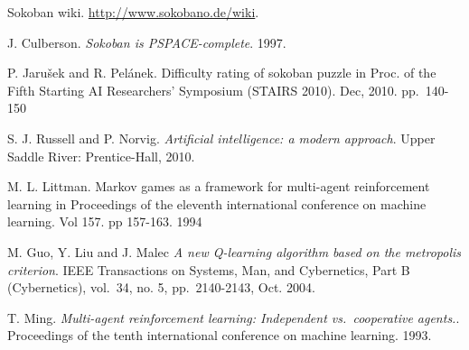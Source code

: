 \documentclass[times, 10pt,twocolumn]{article}
\begin{document}
\begin{thebibliography}{9}
Sokoban wiki.
\url{http://www.sokobano.de/wiki}.


J. Culberson. 
\textit{Sokoban is PSPACE-complete}.
1997.

P. Jarušek and R. Pelánek.
Difficulty rating of sokoban puzzle
in Proc. of the Fifth Starting AI Researchers' Symposium (STAIRS 2010).
Dec, 2010. pp.~140-150

S. J. Russell and P. Norvig.
\textit{Artificial intelligence: a modern approach}.
Upper Saddle River: Prentice-Hall, 2010.

M. L. Littman.
Markov games as a framework for multi-agent
reinforcement learning in Proceedings of the eleventh international
conference on machine learning. Vol 157. pp 157-163. 1994

M. Guo, Y. Liu and J. Malec
\textit{A new Q-learning algorithm based on the metropolis criterion}.
IEEE Transactions on Systems, Man, and Cybernetics, Part B (Cybernetics), vol.~34, no. 5, pp.~2140-2143, Oct. 2004.

T. Ming.
\textit{Multi-agent reinforcement learning: Independent vs.~cooperative agents.}.
Proceedings of the tenth international conference on machine learning. 1993.

\end{thebibliography}
\end{document}
